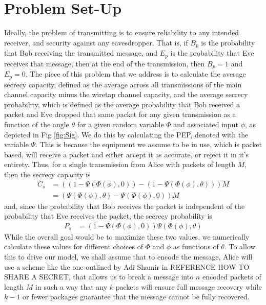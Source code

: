 \documentclass[letterpaper, 10 pt, conference]{ieeetran}  %
\theoremstyle{definition}
\theoremstyle{theorem}
\begin{document}
\section{Problem Set-Up}
\label{sec:prob}
Ideally, the problem of transmitting is to ensure reliability to any intended receiver, and security against any eavesdropper.  
That is, if $B_{p}$ is the probability that Bob receiving the transmitted message, and $E_{p}$ is the probability that Eve receives that message, then at the end of the transmission, then $B_{p} = 1$ and $E_{p} = 0$.  
The piece of this problem that we address is to calculate the average secrecy capacity, defined as the average across all transmissions of the main channel capacity minus the wiretap channel capacity, and the average secrecy probability, which is defined as the average probability that Bob received a packet and Eve dropped that same packet for any given transmission as a function of the angle $\theta$ for a given random variable $\Phi$ and associated input $\phi$, as depicted in Fig \ref{fig:Sig}.  
We do this by calculating the \ac{PEP}, denoted with the variable $\Psi$.  
This is because the equipment we assume to be in use, which is packet based, will receive a packet and either accept it as accurate, or reject it in it's entirety.  
Thus, for a single transmission from Alice with packets of length $M$, then the secrecy capacity is 
\begin{align*}
C_s &= \left(\left(1-\Psi\left(\Phi\left(\phi\right),0\right)\right) - \left(1 - \Psi\left(\Phi\left(\phi\right),\theta\right)\right)\right)M\\
&=  \left(\Psi\left(\Phi\left(\phi\right),\theta\right) -  \Psi\left(\Phi\left(\phi\right),0\right)\right)M
\end{align*}
and, since the probability that Bob receives the packet is independent of the probability that Eve receives the packet, the secrecy probability is
\begin{align*}
P_s &= \left(1-\Psi\left(\Phi\left(\phi\right),0\right)\right)\Psi\left(\Phi\left(\phi\right),\theta\right)
\end{align*}
While the overall goal would be to maximize these two values, we numerically calculate these values for different choices of $\Phi$ and $\phi$ as functions of $\theta$.  
To allow this to drive our model, we shall assume that to encode the message, Alice will use a scheme like the one outlined by Adi Shamir in REFERENCE HOW TO SHARE A SECRET, that allows us to break a message into $n$ encoded packets of length $M$ in such a way that any $k$ packets will ensure full message recovery while $k-1$ or fewer packages guarantee that the message cannot be fully recovered.  
\end{document}
